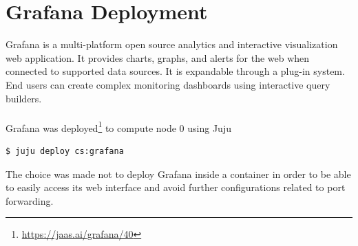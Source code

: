 \documentclass[11pt,a4paper]{article}
\begin{document}
\section{Grafana Deployment}
Grafana is a multi-platform open source analytics and interactive visualization web application. It provides charts, graphs, and alerts for the web when connected to supported data sources. It is expandable through a plug-in system. End users can create complex monitoring dashboards using interactive query builders.\\
\\
Grafana was deployed\footnote{\url{https://jaas.ai/grafana/40}} to compute node 0 using Juju
\begin{lstlisting}[]
$ juju deploy cs:grafana
\end{lstlisting}
The choice was made not to deploy Grafana inside a container in order to be able to easily access its web interface and avoid further configurations related to port forwarding.
\end{document}

